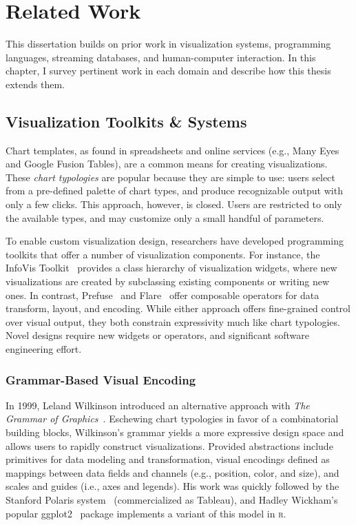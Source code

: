 \chapter{Related Work}
\label{sec:related_work}

This dissertation builds on prior work in visualization systems, programming
languages, streaming databases, and human-computer interaction. In this chapter,
I survey pertinent work in each domain and describe how this thesis extends
them.

\vspace{-20pt}

\section{Visualization Toolkits \& Systems}

\vspace{-7pt}

Chart templates, as found in spreadsheets and online services (e.g., Many
Eyes~\cite{ibm:manyeyes} and Google Fusion Tables), are a common means for
creating visualizations. These \emph{chart typologies} are popular because they
are simple to use: users select from a pre-defined palette of chart types, and
produce recognizable output with only a few clicks. This approach, however, is
closed. Users are restricted to only the available types, and may customize only
a small handful of parameters.

To enable custom visualization design, researchers have developed programming
toolkits that offer a number of visualization components. For instance, the
InfoVis Toolkit~\cite{fekete:ivtk} provides a class hierarchy of visualization
widgets, where new visualizations are created by subclassing existing components
or writing new ones. In contrast, Prefuse~\cite{heer:prefuse} and
Flare~\cite{flare} offer composable operators for data transform, layout, and
encoding. While either approach offers fine-grained control over visual output,
they both constrain expressivity much like chart typologies. Novel designs
require new widgets or operators, and significant software engineering effort.

\subsection{Grammar-Based Visual Encoding}

In 1999, Leland Wilkinson introduced an alternative approach with \emph{The
Grammar of Graphics}~\cite{wilkinson:grammar}. Eschewing chart typologies in
favor of a combinatorial building blocks, Wilkinson's grammar yields a more
expressive design space and allows users to rapidly construct visualizations.
Provided abstractions include primitives for data modeling and transformation,
visual encodings defined as mappings between data fields and channels (e.g.,
position, color, and size), and scales and guides (i.e., axes and legends). His
work was quickly followed by the Stanford Polaris system~\cite{stolte:polaris}
(commercialized as Tableau), and Hadley Wickham's popular
ggplot2~\cite{wickham:layered} package implements a variant of this model in
\textsc{r}.

